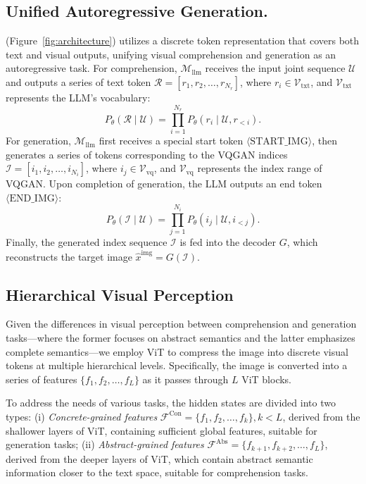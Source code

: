 \subsection{Unified Autoregressive Generation.}  
\ourmethod{} (Figure~\ref{fig:architecture}) utilizes a discrete token representation that covers both text and visual outputs, unifying visual comprehension and generation as an autoregressive task. 
For comprehension, $\mathcal{M}_\text{llm}$ receives the input joint sequence $\mathcal{U}$ and outputs a series of text token $\mathcal{R} = [r_1, r_2, \dots, r_{N_r}]$, where $r_i \in \mathcal{V}_{\text{txt}}$, and $\mathcal{V}_{\text{txt}}$ represents the LLM's vocabulary:
\begin{equation}
    P_\theta(\mathcal{R} \mid \mathcal{U}) = \prod_{i=1}^{N_r} P_\theta(r_i \mid \mathcal{U}, r_{<i}).
\end{equation}
For generation, $\mathcal{M}_\text{llm}$ first receives a special start token $\langle \text{START\_IMG} \rangle$, then generates a series of tokens corresponding to the VQGAN indices $\mathcal{I} = [i_1, i_2, \dots, i_{N_i}]$, where $i_j \in \mathcal{V}_{\text{vq}}$, and $\mathcal{V}_{\text{vq}}$ represents the index range of VQGAN. Upon completion of generation, the LLM outputs an end token $\langle \text{END\_IMG} \rangle$:
\begin{equation}
    P_\theta(\mathcal{I} \mid \mathcal{U}) = \prod_{j=1}^{N_i} P_\theta(i_j \mid \mathcal{U}, i_{<j}).
\end{equation}
Finally, the generated index sequence $\mathcal{I}$ is fed into the decoder $G$, which reconstructs the target image $\hat{x}^{\text{img}} = G(\mathcal{I})$.

\subsection{Hierarchical Visual Perception}  
Given the differences in visual perception between comprehension and generation tasks—where the former focuses on abstract semantics and the latter emphasizes complete semantics—we employ ViT to compress the image into discrete visual tokens at multiple hierarchical levels.
Specifically, the image is converted into a series of features $\{f_1, f_2, \dots, f_L\}$ as it passes through $L$ ViT blocks.

To address the needs of various tasks, the hidden states are divided into two types: (i) \textit{Concrete-grained features} $\mathcal{F}^{\text{Con}} = \{f_1, f_2, \dots, f_k\}, k < L$, derived from the shallower layers of ViT, containing sufficient global features, suitable for generation tasks; 
(ii) \textit{Abstract-grained features} $\mathcal{F}^{\text{Abs}} = \{f_{k+1}, f_{k+2}, \dots, f_L\}$, derived from the deeper layers of ViT, which contain abstract semantic information closer to the text space, suitable for comprehension tasks.

